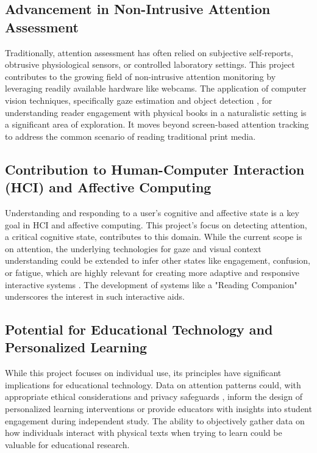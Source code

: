 \subsection{Advancement in Non-Intrusive Attention Assessment}
Traditionally, attention assessment has often relied on subjective self-reports, obtrusive physiological sensors, or controlled laboratory settings. This project contributes to the growing field of non-intrusive attention monitoring by leveraging readily available hardware like webcams. The application of computer vision techniques, specifically gaze estimation \cite{L2CSNet2022} and object detection \cite{Redmon_YOLO_2016}, for understanding reader engagement with physical books in a naturalistic setting is a significant area of exploration. It moves beyond screen-based attention tracking to address the common scenario of reading traditional print media.

\subsection{Contribution to Human-Computer Interaction (HCI) and Affective Computing}
Understanding and responding to a user's cognitive and affective state is a key goal in HCI and affective computing. This project's focus on detecting attention, a critical cognitive state, contributes to this domain. While the current scope is on attention, the underlying technologies for gaze and visual context understanding could be extended to infer other states like engagement, confusion, or fatigue, which are highly relevant for creating more adaptive and responsive interactive systems \cite{Sharma_AttentionClassroom_2023}. The development of systems like a "Reading Companion" \cite{Lai_ReadingCompanion_2017} underscores the interest in such interactive aids.

\subsection{Potential for Educational Technology and Personalized Learning}
While this project focuses on individual use, its principles have significant implications for educational technology. Data on attention patterns could, with appropriate ethical considerations and privacy safeguards \cite{Gupta_EthicalAIEd_2024}, inform the design of personalized learning interventions or provide educators with insights into student engagement during independent study. The ability to objectively gather data on how individuals interact with physical texts when trying to learn could be valuable for educational research.


